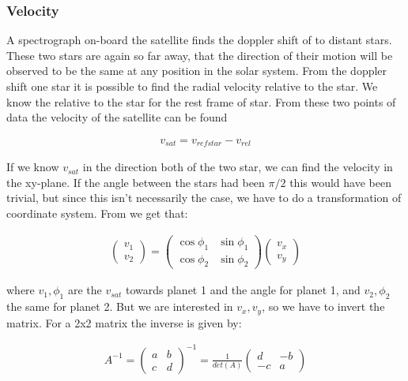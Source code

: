 \documentclass[a4paper, 10pt]{article}
\begin{document}
\subsubsection{Velocity}
A spectrograph on-board the satellite finds the doppler shift of to distant stars. These two stars are again so far away, that the direction of their motion will be observed to be the same at any position in the solar system. From the doppler shift one star it is possible to find the radial velocity relative to the star. We know the  relative to the star for the rest frame of star. From these two points of data the velocity of the satellite can be found

\begin{align}
v_{sat} = v_{refstar} - v_{rel}
\end{align}

If we know $v_{sat}$ in the direction both of the two star, we can find the velocity in the xy-plane. If the angle between the stars had been $\pi/2$ this would have been trivial, but since this isn't necessarily the case, we have to do a transformation of coordinate system. From \cite{part4} we get that:

\begin{align}
\begin{pmatrix}
v_1\\
v_2
\end{pmatrix}
=
\begin{pmatrix}
\cos \phi_1 & \sin \phi_1 \\
\cos \phi_2 & \sin \phi_2 
\end{pmatrix}
\begin{pmatrix}
v_x\\
v_y
\end{pmatrix}
\end{align}  

where $v_1,\phi_1$ are the $v_{sat}$ towards planet 1 and the angle for planet 1, and $v_2,\phi_2$ the same for planet 2. But we are interested in $v_x,
v_y$, so we have to invert the matrix. For a 2x2 matrix the inverse is given by:

\begin{align}
A^{-1} = 
\begin{pmatrix}
a & b \\
c & d 
\end{pmatrix}^{-1}
=
\frac{1}{det(A)} 
\begin{pmatrix}
d & -b \\
-c & a 
\end{pmatrix}
\end{align}
\end{document}
